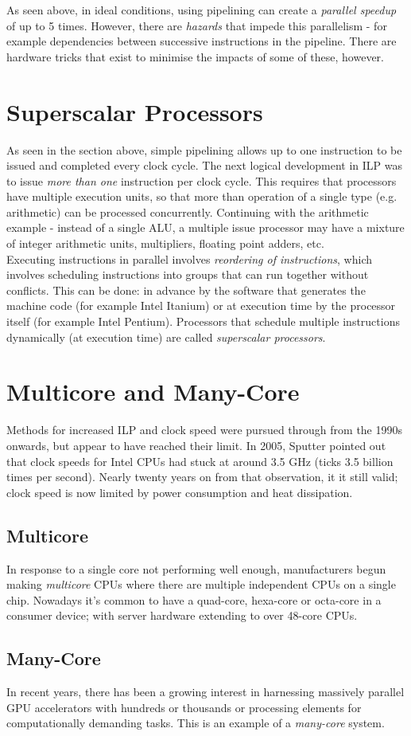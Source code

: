 As seen above, in ideal conditions, using pipelining can create a \textit{parallel speedup} of up to 5 times. However, there are \textit{hazards} that impede this parallelism - for example dependencies between successive instructions in the pipeline. There are hardware tricks that exist to minimise the impacts of some of these, however.

\section{Superscalar Processors}
As seen in the section above, simple pipelining allows up to one instruction to be issued and completed every clock cycle. The next logical development in ILP was to issue \textit{more than one} instruction per clock cycle. This requires that processors have multiple execution units, so that more than operation of a single type (e.g. arithmetic) can be processed concurrently. Continuing with the arithmetic example - instead of a single ALU, a multiple issue processor may have a mixture of integer arithmetic units, multipliers, floating point adders, etc.\\

Executing instructions in parallel involves \textit{reordering of instructions}, which involves scheduling instructions into groups that can run together without conflicts. This can be done: in advance by the software that generates the machine code (for example Intel Itanium) or at execution time by the processor itself (for example Intel Pentium). Processors that schedule multiple instructions dynamically (at execution time) are called \textit{superscalar processors}. 

\section{Multicore and Many-Core}
Methods for increased ILP and clock speed were pursued through from the 1990s onwards, but appear to have reached their limit. In 2005, Sputter pointed out that clock speeds for Intel CPUs had stuck at around 3.5 GHz (ticks 3.5 billion times per second). Nearly twenty years on from that observation, it it still valid; clock speed is now limited by power consumption and heat dissipation.
\subsection{Multicore}
In response to a single core not performing well enough, manufacturers begun making \textit{multicore} CPUs where there are multiple independent CPUs on a single chip. Nowadays it's common to have a quad-core, hexa-core or octa-core in a consumer device; with server hardware extending to over 48-core CPUs.

\subsection{Many-Core}
In recent years, there has been a growing interest in harnessing massively parallel GPU accelerators with hundreds or thousands or processing elements for computationally demanding tasks. This is an example of a \textit{many-core} system. 